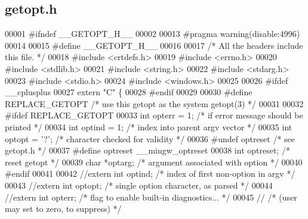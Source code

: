 \subsection{getopt.\+h}
\label{soapysdr_2apps_2msvc_2getopt_8h_source}

\begin{DoxyCode}
00001 \textcolor{preprocessor}{#ifndef \_\_GETOPT\_H\_\_}
00002 
00013 \textcolor{preprocessor}{#pragma warning(disable:4996)}
00014 
00015 \textcolor{preprocessor}{#define \_\_GETOPT\_H\_\_}
00016 
00017 \textcolor{comment}{/* All the headers include this file. */}
00018 \textcolor{preprocessor}{#include <crtdefs.h>}
00019 \textcolor{preprocessor}{#include <errno.h>}
00020 \textcolor{preprocessor}{#include <stdlib.h>}
00021 \textcolor{preprocessor}{#include <string.h>}
00022 \textcolor{preprocessor}{#include <stdarg.h>}
00023 \textcolor{preprocessor}{#include <stdio.h>}
00024 \textcolor{preprocessor}{#include <windows.h>}
00025 
00026 \textcolor{preprocessor}{#ifdef \_\_cplusplus}
00027 \textcolor{keyword}{extern} \textcolor{stringliteral}{"C"} \{
00028 \textcolor{preprocessor}{#endif}
00029 
00030 \textcolor{preprocessor}{#define REPLACE\_GETOPT      }\textcolor{comment}{/* use this getopt as the system getopt(3) */}\textcolor{preprocessor}{}
00031 
00032 \textcolor{preprocessor}{#ifdef REPLACE\_GETOPT}
00033 \textcolor{keywordtype}{int} opterr = 1;     \textcolor{comment}{/* if error message should be printed */}
00034 \textcolor{keywordtype}{int} optind = 1;     \textcolor{comment}{/* index into parent argv vector */}
00035 \textcolor{keywordtype}{int} optopt = \textcolor{charliteral}{'?'};       \textcolor{comment}{/* character checked for validity */}
00036 \textcolor{preprocessor}{#undef  optreset        }\textcolor{comment}{/* see getopt.h */}\textcolor{preprocessor}{}
00037 \textcolor{preprocessor}{#define optreset        \_\_mingw\_optreset}
00038 \textcolor{keywordtype}{int} optreset;       \textcolor{comment}{/* reset getopt */}
00039 \textcolor{keywordtype}{char}    *optarg;        \textcolor{comment}{/* argument associated with option */}
00040 \textcolor{preprocessor}{#endif}
00041 
00042 \textcolor{comment}{//extern int optind;        /* index of first non-option in argv      */}
00043 \textcolor{comment}{//extern int optopt;        /* single option character, as parsed     */}
00044 \textcolor{comment}{//extern int opterr;        /* flag to enable built-in diagnostics... */}
00045 \textcolor{comment}{//              /* (user may set to zero, to suppress)    */}

\end{DoxyCode}
